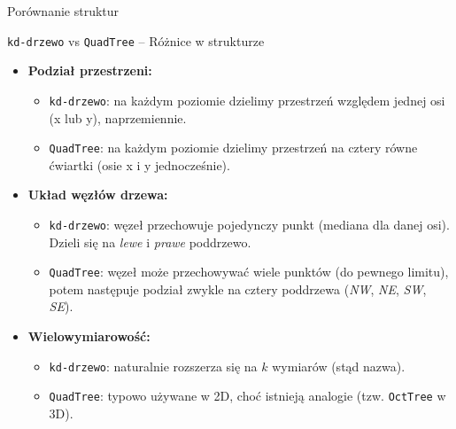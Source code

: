 \documentclass[aspectratio=1610, polish]{beamer}
\begin{document}
\begin{section}{Porównanie struktur}

\begin{frame}{\texttt{kd-drzewo} vs \texttt{QuadTree} -- Różnice w strukturze}
    \begin{itemize}
        \item \textbf{Podział przestrzeni:}
            \begin{itemize}
                \item \texttt{kd-drzewo}: na każdym poziomie dzielimy przestrzeń względem jednej osi (x lub y), naprzemiennie.
                \item \texttt{QuadTree}: na każdym poziomie dzielimy przestrzeń na cztery równe ćwiartki (osie x i y jednocześnie).
            \end{itemize}
            \vspace{0.4em}
            
        \item \textbf{Układ węzłów drzewa:}
            \begin{itemize}
                \item \texttt{kd-drzewo}: węzeł przechowuje pojedynczy punkt (mediana dla danej osi). Dzieli się na \emph{lewe} i \emph{prawe} poddrzewo.
                \item \texttt{QuadTree}: węzeł może przechowywać wiele punktów (do pewnego limitu), potem następuje podział zwykle na cztery poddrzewa (\emph{NW}, \emph{NE}, \emph{SW}, \emph{SE}).
            \end{itemize}
            \vspace{0.4em}
            
        \item \textbf{Wielowymiarowość:}
            \begin{itemize}
                \item \texttt{kd-drzewo}: naturalnie rozszerza się na \(k\) wymiarów (stąd nazwa).
                \item \texttt{QuadTree}: typowo używane w 2D, choć istnieją analogie (tzw. \texttt{OctTree} w 3D).
            \end{itemize}
    \end{itemize}
\end{frame}


\end{section}
\end{document}
